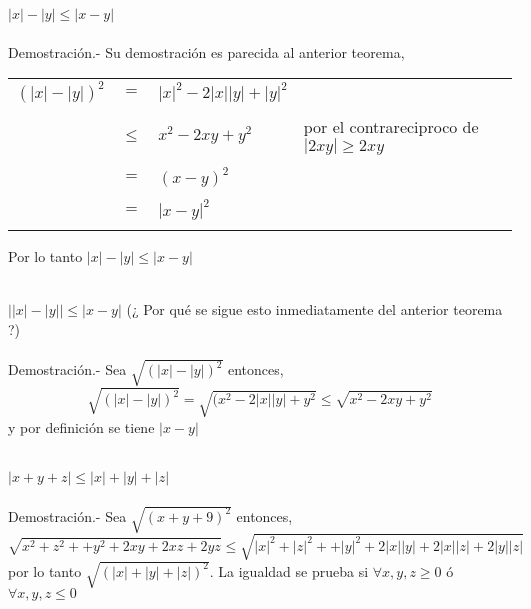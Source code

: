 \begin{teo}
$|x|-|y|\leq |x-y|$\\\\
Demostración.- \; Su demostración es parecida al anterior teorema, 
\begin{center}
\begin{tabular}{r c l l}
$(|x|-|y|)^2$&$=$&$|x|^2-2|x||y|+|y|^2$&\\\\
&$\leq$&$x^2-2xy+y^2$& por el contrareciproco de $|2xy|\geq 2xy$\\\\
&$=$&$(x-y)^2$&\\\\
&$=$&$|x-y|^2$&\\\\
\end{tabular}
\end{center}
Por lo tanto $|x|-|y|\leq |x-y|$\\\\
\end{teo}

\begin{teo}
$\left| |x|-|y| \right| \leq |x-y|$ (¿ Por qué se sigue esto inmediatamente del anterior teorema ?)\\\\
Demostración.- \;  Sea $\sqrt{(|x|-|y|)^2}$ entonces, $$\sqrt{(|x|-|y|)^2}=\sqrt{(x^2-2|x||y|+y^2}\leq \sqrt{x^2-2xy+y^2}$$ y por definición se tiene $|x-y|$\\\\
\end{teo} 

\begin{teo}
$|x+y+z| \leq |x|+|y|+|z|$\\\\
Demostración.- \: Sea $\sqrt{(x+y+9)^2}$ entonces,  $$\sqrt{x^2+z^2++y^2+2xy+2xz+2yz} \leq \sqrt{|x|^2+|z|^2++|y|^2+2|x||y|+2|x||z|+2|y||z|}$$ por lo tanto $\sqrt{(|x|+|y|+|z|)^2}$. La igualdad se prueba si $\forall x,y,z \geq 0$ ó $\forall x,y,z \leq 0$\\\\
\end{teo}

